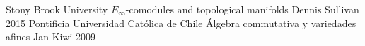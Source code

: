 
		{Stony Brook University}
		{$E_\infty$-comodules and topological manifolds}
		{Dennis Sullivan}
		{2015}
		{Pontificia Universidad Católica de Chile}
		{Álgebra commutativa y variedades afines}
		{Jan Kiwi}
		{2009}